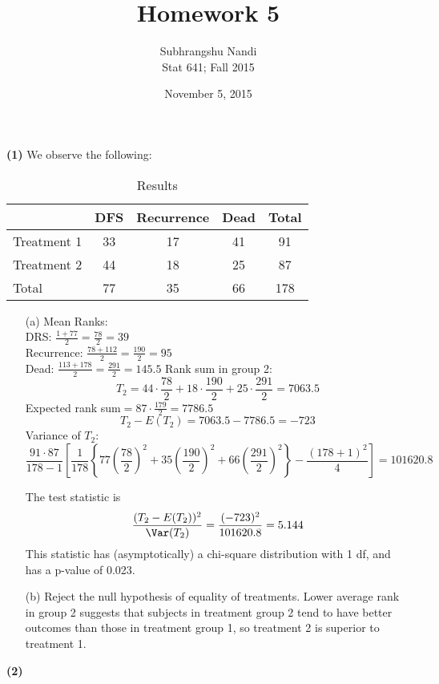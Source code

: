 \documentclass[11pt,a4paper]{article}
\begin{document}
\title{Homework 5}
\author{Subhrangshu Nandi\\
  Stat 641; Fall 2015}
\date{November 5, 2015}

\maketitle

\noindent
\textbf{(1)} 
We observe the following:

\begin{table}[ht]
\centering
\begin{tabular}{lcccc}
  \hline
 & DFS & Recurrence & Dead & Total \\ 
  \hline
	Treatment 1 & 33 & 17 & 41 & 91\\
	Treatment 2 & 44 & 18 & 25 & 87\\
   \hline
	Total  & 77 & 35 & 66 & 178\\
   \hline
\end{tabular}
\caption{Results}
\end{table}
\begin{enumerate}
\item[(a)] Mean Ranks: \\
DRS: $\frac{1 + 77}{2} = \frac{78}{2} = 39$ \\
Recurrence: $\frac{78 + 112}{2} = \frac{190}{2} = 95$\\
Dead: $\frac{113+178}{2} = \frac{291}{2} = 145.5$
Rank sum in group 2: $$T_2=44\cdot\frac{78}{2}+18\cdot\frac{190}{2}+25\cdot\frac{291}{2}=7063.5$$
Expected rank sum$=87\cdot\frac{179}{2}=7786.5$
$$T_2-E(T_2)=7063.5-7786.5=-723$$
Variance of $T_2$: 
$$\frac{91\cdot 87}{178-1}\left[\frac{1}{178}\left\{ 77\left(\frac{78}{2}\right)^2 +35\left(\frac{190}{2}\right)^2 +66\left(\frac{291}{2}\right)^2\right\} - \frac{(178+1)^2}{4}\right]=101620.8 $$

The test statistic is $$\frac{(T_2-E(T_2))^2}{\Var(T_2)} = \frac{(-723)^2}{101620.8} = 5.144$$ 
This statistic has (asymptotically) a chi-square distribution with 1 df, and has a p-value of 0.023. 

\item[(b)]
Reject the null hypothesis of equality of treatments. Lower average rank in group 2 suggests that subjects in treatment group 2 tend to have
better outcomes than those in treatment group 1, so treatment 2 is superior to treatment 1. 

\end{enumerate}
\noindent
\textbf{(2)} 
\end{document}
